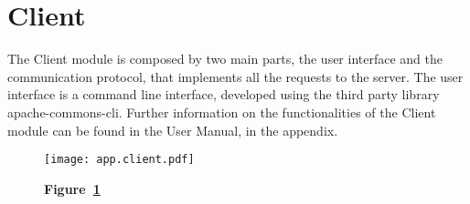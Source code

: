 \section{Client}\label{sec:client}
The Client module is composed by two main parts, the user interface and the
communication protocol, that implements all the requests to the server.
The user interface is a command line interface, developed using the third party
library apache-commons-cli.
Further information on the functionalities of the Client module can be found in
the User Manual, in the appendix.

\begin{landscape}
	\begin{figure}[!h]
		\texttt{[image: app.client.pdf]}
		\caption*{\textbf{Figure~\ref{fig:client}}}
		\captionlistentry{}\label{fig:client}
	\end{figure}
\end{landscape}
